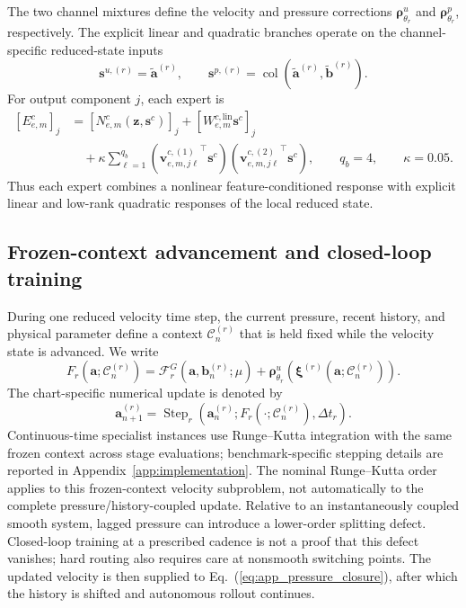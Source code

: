 \documentclass{article}
\def\plaineqref#1{\ref{#1}}
\begin{document}
The two channel mixtures define the velocity and pressure corrections
$\bm\rho_{\theta_r}^u$ and $\bm\rho_{\theta_r}^p$, respectively. The explicit linear and quadratic branches operate on the channel-specific reduced-state inputs
\begin{equation}
  \bm s^{u,(r)}
  =
  \widetilde{\bm a}^{(r)},
  \qquad
  \bm s^{p,(r)}
  =
  \operatorname{col}
  \left(
    \widetilde{\bm a}^{(r)},
    \widetilde{\bm b}^{(r)}
  \right).
  \label{eq:app_expert_state_slices}
\end{equation}
For output component $j$, each expert is
\begin{align}
  \left[E_{e,m}^c\right]_j
  &=
  \left[
    N_{e,m}^c
    \left(
      \bm z,\bm s^c
    \right)
  \right]_j
  +
  \left[
    W_{e,m}^{c,\mathrm{lin}}
    \bm s^c
  \right]_j
  \nonumber\\
  &\quad+
  \kappa
  \sum_{\ell=1}^{q_b}
  \left(
    {\bm v_{e,m,j\ell}^{c,(1)}}^{\top}
    \bm s^c
  \right)
  \left(
    {\bm v_{e,m,j\ell}^{c,(2)}}^{\top}
    \bm s^c
  \right),
  \qquad
  q_b=4,
  \qquad
  \kappa=0.05.
  \label{eq:app_structured_expert}
\end{align}
Thus each expert combines a nonlinear feature-conditioned response with
explicit linear and low-rank quadratic responses of the local reduced state.


\subsection{Frozen-context advancement and closed-loop training}

During one reduced velocity time step, the current pressure, recent history, and
physical parameter define a context $\mathcal C_n^{(r)}$ that is held fixed
while the velocity state is advanced. We write
\begin{equation}
  F_r
  \left(
    \bm a;\mathcal C_n^{(r)}
  \right)
  =
  \mathcal F_r^G
  \left(
    \bm a,\bm b_n^{(r)};\mu
  \right)
  +
  \bm\rho^u_{\theta_r}
  \left(
    \bm\xi^{(r)}
    \left(
      \bm a;\mathcal C_n^{(r)}
    \right)
  \right).
  \label{eq:app_frozen_context_rhs}
\end{equation}
The chart-specific numerical update is denoted by
\begin{equation}
  \bm a_{n+1}^{(r)}
  =
  \operatorname{Step}_r
  \left(
    \bm a_n^{(r)};
    F_r(\cdot;\mathcal C_n^{(r)}),
    \Delta t_r
  \right).
  \label{eq:app_specialist_step}
\end{equation}
Continuous-time specialist instances use Runge--Kutta integration with the
same frozen context across stage evaluations; benchmark-specific stepping
details are reported in Appendix~\ref{app:implementation}.
The nominal Runge--Kutta order applies to this frozen-context velocity subproblem, not automatically to the complete pressure/history-coupled update. Relative to an instantaneously coupled smooth system, lagged pressure can introduce a lower-order splitting defect. Closed-loop training at a prescribed cadence is not a proof that this defect vanishes; hard routing also requires care at nonsmooth switching points.
The updated velocity is then supplied to
Eq.~(\plaineqref{eq:app_pressure_closure}), after which the history is
shifted and autonomous rollout continues.
\end{document}
